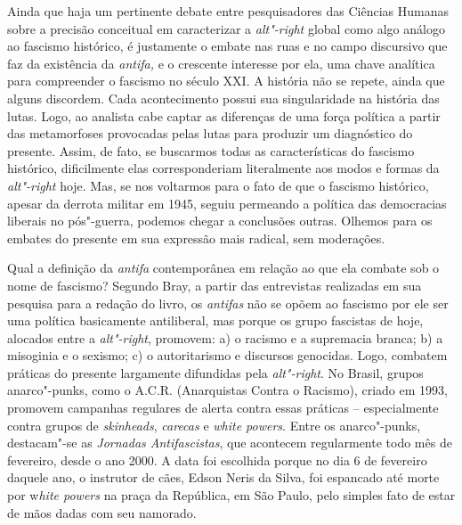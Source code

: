 Ainda que haja um pertinente debate entre pesquisadores das Ciências
Humanas sobre a precisão conceitual em caracterizar a \emph{alt"-right}
global como algo análogo ao fascismo histórico, é justamente o embate
nas ruas e no campo discursivo que faz da existência da \emph{antifa,} e
o crescente interesse por ela, uma chave analítica para compreender o
fascismo no século XXI. A história não se repete, ainda que alguns
discordem. Cada acontecimento possui sua singularidade na história das
lutas. Logo, ao analista cabe captar as diferenças de uma força política
a partir das metamorfoses provocadas pelas lutas para produzir um
diagnóstico do presente. Assim, de fato, se buscarmos todas as
características do fascismo histórico, dificilmente elas corresponderiam
literalmente aos modos e formas da \emph{alt"-right} hoje. Mas, se nos
voltarmos para o fato de que o fascismo histórico, apesar da derrota
militar em 1945, seguiu permeando a política das democracias liberais no
pós"-guerra, podemos chegar a conclusões outras. Olhemos para os embates
do presente em sua expressão mais radical, sem moderações.

Qual a definição da \emph{antifa} contemporânea em relação ao que ela
combate sob o nome de fascismo? Segundo Bray, a partir das entrevistas
realizadas em sua pesquisa para a redação do livro, os \emph{antifas}
não se opõem ao fascismo por ele ser uma política basicamente
antiliberal, mas porque os grupo fascistas de hoje, alocados entre a
\emph{alt"-right}, promovem: a) o racismo e a supremacia branca; b) a
misoginia e o sexismo; c) o autoritarismo e discursos genocidas. Logo,
combatem práticas do presente largamente difundidas pela
\emph{alt"-right}. No Brasil, grupos anarco"-punks, como o A.C.R.
(Anarquistas Contra o Racismo), criado em 1993, promovem campanhas
regulares de alerta contra essas práticas -- especialmente contra grupos
de \emph{skinheads}, \emph{carecas} e \emph{white powers}. Entre os
anarco"-punks, destacam"-se as \emph{Jornadas Antifascistas}, que
acontecem regularmente todo mês de fevereiro, desde o ano 2000. A data
foi escolhida porque no dia 6 de fevereiro daquele ano, o instrutor de
cães, Edson Neris da Silva, foi espancado até morte por w\emph{hite
powers} na praça da República, em São Paulo, pelo simples fato de estar
de mãos dadas com seu namorado.

